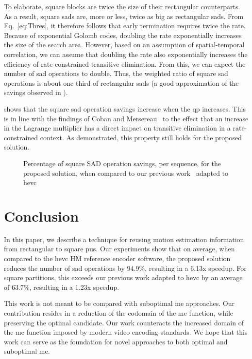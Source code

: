 \documentclass{article}
\newcommand{\eq}[1]{Eq.~\eqref{#1}}
\begin{document}
To elaborate, square blocks are twice the size of their rectangular counterparts. As a result, square \glspl{sad} are, more or less, twice as big as rectangular \glspl{sad}. From \eq{eq:Thres}, it therefore follows that early termination requires twice the rate. Because of exponential Golomb codes, doubling the rate exponentially increases the size of the search area. However, based on an assumption of spatial-temporal correlation, we can assume that doubling the rate also exponentially increases the efficiency of rate-constrained transitive elimination. From this, we can expect the number of \gls{sad} operations to double. Thus, the weighted ratio of square \gls{sad} operations is about one third of rectangular \glspl{sad} (a good approximation of the savings observed in ).

 shows that the square \gls{sad} operation savings increase when the \gls{qp} increases. This is in line with the findings of Coban and Mersereau~\cite{Coban1998} to the effect that an increase in the Lagrange multiplier has a direct impact on transitive elimination in a rate-constrained context. As demonstrated, this property still holds for the proposed solution.

\begin{figure}[htb]
  \centering
  
  \vspace{-2em}
  \caption{\small{Percentage of square SAD operation savings, per sequence, for the proposed solution, when compared to our previous work~\cite{Trud14} adapted to \gls{hevc}}}
  \label{fig:SADSavingBar}
\end{figure}

\section{Conclusion}
\vspace{-0.5em}
In this paper, we describe a technique for reusing motion estimation information from rectangular to square \glspl{pu}. Our experiments show that on average, when compared to the \gls{hevc} HM reference encoder software, the proposed solution reduces the number of \gls{sad} operations by $94.9\%$, resulting in a 6.13x speedup. For square partitions, this exceeds our previous work adapted to \gls{hevc} by an average of $63.7\%$, resulting in a 1.23x speedup.

This work is not meant to be compared with suboptimal \gls{me} approaches. Our contribution resides in a reduction of the codomain of the \gls{me} function, while preserving the optimal candidate. Our work counteracts the increased domain of the \gls{me} function imposed by modern video encoding standards. We hope that this work can serve as the foundation for novel approaches to both optimal and suboptimal \gls{me}.



\end{document}
